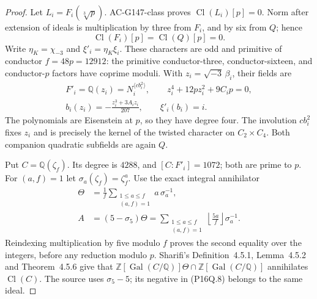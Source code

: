 \begin{proof}
Let $L_i=F_i(\sqrt[3]p)$.  AC-G147-class proves
$\operatorname{Cl}(L_i)[p]=0$.
Norm after extension of ideals is multiplication by three from
$F_i$, and by six from $Q$; hence
\[
                 \operatorname{Cl}(F_i)[p]
                    =\operatorname{Cl}(Q)[p]=0.
 \tag{P16Q.6}
\]
Write $\eta_K=\chi_{-3}$ and $\xi'_i=\eta_K\xi_i$.
These characters are odd and primitive of conductor
$f=48p=12912$: the primitive conductor-three, conductor-sixteen,
and conductor-$p$ factors have coprime moduli.
With $z_i=\sqrt{-3}\,\beta_i$, their fields are
\[
 \begin{gathered}
 F'_i=\mathbb Q(z_i)=N_i^{\langle cb_i^2\rangle},\qquad
 z_i^4+12pz_i^2+9C_i p=0,\\
 b_i(z_i)=-\frac{z_i^3+3A_i z_i}{207},
                        \qquad\xi'_i(b_i)=i.
 \end{gathered}
 \tag{P16Q.7}
\]
The polynomials are Eisenstein at $p$, so they have degree four.
The involution $cb_i^2$ fixes $z_i$ and is precisely the kernel
of the twisted character on $C_2\times C_4$.
Both companion quadratic subfields are again $Q$.

Put $C=\mathbb Q(\zeta_f)$.
Its degree is $4288$, and $[C:F'_i]=1072$; both are prime to $p$.
For $(a,f)=1$ let $\sigma_a(\zeta_f)=\zeta_f^a$.
Use the exact integral annihilator
\[
 \begin{aligned}
 \Theta&=\frac1f\sum_{\substack{1\leq a\leq f\\(a,f)=1}}
                            a\,\sigma_a^{-1},\\
 A&=(5-\sigma_5)\Theta
   =\sum_{\substack{1\leq a\leq f\\(a,f)=1}}
                  \left\lfloor\frac{5a}{f}\right\rfloor\sigma_a^{-1}.
 \end{aligned}
 \tag{P16Q.8}
\]
Reindexing multiplication by five modulo $f$ proves the second
equality over the integers, before any reduction modulo $p$.
Sharifi's Definition~4.5.1, Lemma~4.5.2 and Theorem~4.5.6 give
that $\mathbb Z[\operatorname{Gal}(C/\mathbb Q)]\Theta
\cap\mathbb Z[\operatorname{Gal}(C/\mathbb Q)]$ annihilates
$\operatorname{Cl}(C)$.  The source uses $\sigma_5-5$;
its negative in (P16Q.8) belongs to the same ideal.


\end{proof}
